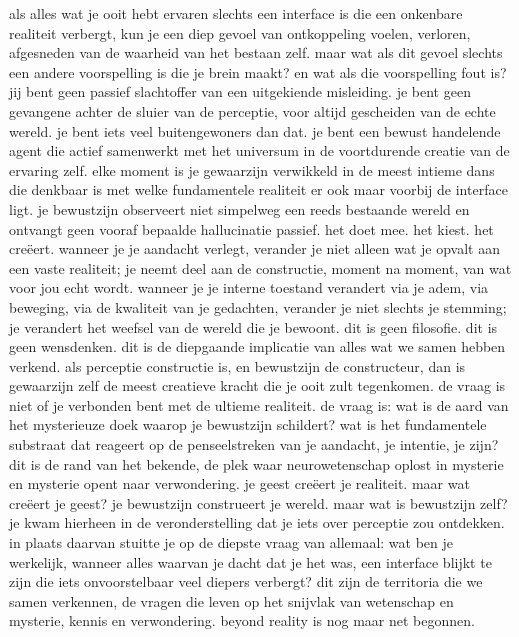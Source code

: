 als alles wat je ooit hebt ervaren slechts een interface is die een onkenbare realiteit verbergt, kun je een diep gevoel van ontkoppeling voelen, verloren, afgesneden van de waarheid van het bestaan zelf. maar wat als dit gevoel slechts een andere voorspelling is die je brein maakt? en wat als die voorspelling fout is? jij bent geen passief slachtoffer van een uitgekiende misleiding. je bent geen gevangene achter de sluier van de perceptie, voor altijd gescheiden van de echte wereld. je bent iets veel buitengewoners dan dat. je bent een bewust handelende agent die actief samenwerkt met het universum in de voortdurende creatie van de ervaring zelf. elke moment is je gewaarzijn verwikkeld in de meest intieme dans die denkbaar is met welke fundamentele realiteit er ook maar voorbij de interface ligt. je bewustzijn observeert niet simpelweg een reeds bestaande wereld en ontvangt geen vooraf bepaalde hallucinatie passief. het doet mee. het kiest. het creëert.
wanneer je je aandacht verlegt, verander je niet alleen wat je opvalt aan een vaste realiteit; je neemt deel aan de constructie, moment na moment, van wat voor jou echt wordt. wanneer je je interne toestand verandert via je adem, via beweging, via de kwaliteit van je gedachten, verander je niet slechts je stemming; je verandert het weefsel van de wereld die je bewoont. dit is geen filosofie. dit is geen wensdenken. dit is de diepgaande implicatie van alles wat we samen hebben verkend. als perceptie constructie is, en bewustzijn de constructeur, dan is gewaarzijn zelf de meest creatieve kracht die je ooit zult tegenkomen. de vraag is niet of je verbonden bent met de ultieme realiteit. de vraag is: wat is de aard van het mysterieuze doek waarop je bewustzijn schildert?
wat is het fundamentele substraat dat reageert op de penseelstreken van je aandacht, je intentie, je zijn? dit is de rand van het bekende, de plek waar neurowetenschap oplost in mysterie en mysterie opent naar verwondering. je geest creëert je realiteit. maar wat creëert je geest? je bewustzijn construeert je wereld. maar wat is bewustzijn zelf? je kwam hierheen in de veronderstelling dat je iets over perceptie zou ontdekken. in plaats daarvan stuitte je op de diepste vraag van allemaal: wat ben je werkelijk, wanneer alles waarvan je dacht dat je het was, een interface blijkt te zijn die iets onvoorstelbaar veel diepers verbergt? dit zijn de territoria die we samen verkennen, de vragen die leven op het snijvlak van wetenschap en mysterie, kennis en verwondering. beyond reality is nog maar net begonnen.
